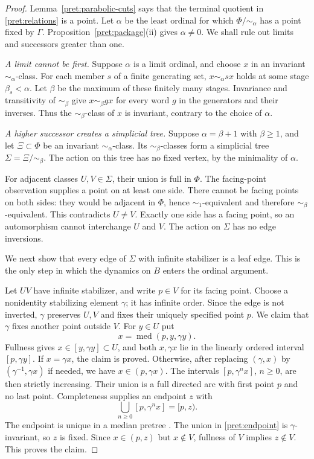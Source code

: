 \begin{proof}
Lemma~\ref{pret:parabolic-cuts} says that the terminal quotient in
\eqref{pret:relations} is a point.  Let $\alpha$ be the least ordinal
for which $\Phi/\sim_\alpha$ has a point fixed by $\Gamma$.
Proposition~\ref{pret:package}\textup{(ii)} gives $\alpha\ne0$.
We shall rule out limits and successors greater than one.

\emph{A limit cannot be first.}
Suppose $\alpha$ is a limit ordinal, and choose $x$ in an invariant
$\sim_\alpha$-class.  For each member $s$ of a finite generating set,
$x\sim_\alpha sx$ holds at some stage $\beta_s<\alpha$.
Let $\beta$ be the maximum of these finitely many stages.  Invariance
and transitivity of $\sim_\beta$ give $x\sim_\beta gx$ for every word
$g$ in the generators and their inverses.  Thus the $\sim_\beta$-class
of $x$ is invariant, contrary to the choice of $\alpha$.

\emph{A higher successor creates a simplicial tree.}
Suppose $\alpha=\beta+1$ with $\beta\ge1$, and let $\Xi\subset\Phi$
be an invariant $\sim_\alpha$-class.  Its $\sim_\beta$-classes form a
simplicial tree $\Sigma=\Xi/\sim_\beta$.  The action on this tree has
no fixed vertex, by the minimality of $\alpha$.

For adjacent classes $U,V\in\Sigma$, their union is full in $\Phi$.
The facing-point observation supplies a point on at least one side.
There cannot be facing points on both sides: they would be adjacent in
$\Phi$, hence $\sim_1$-equivalent and therefore $\sim_\beta$-equivalent.
This contradicts $U\ne V$.  Exactly one side has a facing point, so an
automorphism cannot interchange $U$ and $V$.  The action on $\Sigma$
has no edge inversions.

We next show that every edge of $\Sigma$ with infinite stabilizer is a
leaf edge.  This is the only step in which the dynamics on $B$ enters
the ordinal argument.

Let $UV$ have infinite stabilizer, and write $p\in V$ for its facing
point.  Choose a nonidentity stabilizing element $\gamma$; it has infinite
order.  Since the edge is not inverted, $\gamma$ preserves $U,V$ and
fixes their uniquely specified point $p$.
We claim that $\gamma$ fixes another point outside $V$.
For $y\in U$ put
\[
 x=\operatorname{med}(p,y,\gamma y).
\]
Fullness gives $x\in[y,\gamma y]\subset U$, and both $x,\gamma x$
lie in the linearly ordered interval $[p,\gamma y]$.
If $x=\gamma x$, the claim is proved.  Otherwise, after replacing
$(\gamma,x)$ by $(\gamma^{-1},\gamma x)$ if needed, we have
$x\in(p,\gamma x)$.
The intervals $[p,\gamma^n x]$, $n\ge0$, are then strictly increasing.
Their union is a full directed arc with first point $p$ and no last point.
Completeness supplies an endpoint $z$ with
\begin{equation}\label{pret:endpoint}
 \bigcup_{n\ge0}[p,\gamma^n x]=[p,z).
\end{equation}
The endpoint is unique in a median pretree
\cite[Lemma~3.13 and the following observation]{Bowditch1999Treelike}.
The union in \eqref{pret:endpoint} is $\gamma$-invariant, so $z$ is fixed.
Since $x\in(p,z)$ but $x\notin V$, fullness of $V$ implies $z\notin V$.
This proves the claim.


\end{proof}
